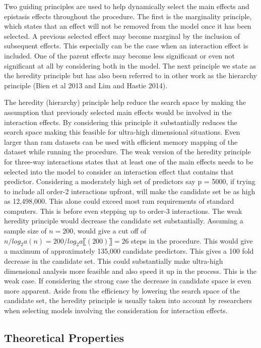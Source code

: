 \documentclass[]{book}
\theoremstyle{definition}
\theoremstyle{definition}
\theoremstyle{remark}
\begin{document}
Two guiding principles are used to help dynamically select the main
effects and epistasis effects throughout the procedure. The first is the
marginality principle, which states that an effect will not be removed
from the model once it has been selected. A previous selected effect may
become marginal by the inclusion of subsequent effects. This especially
can be the case when an interaction effect is included. One of the
parent effects may become less significant or even not significant at
all by considering both in the model. The next principle we state as the
heredity principle but has also been referred to in other work as the
hierarchy principle (Bien et al 2013 and Lim and Hastie 2014).

The heredity (hierarchy) principle help reduce the search space by
making the assumption that previously selected main effects would be
involved in the interaction effects. By considering this principle it
substantially reduces the search space making this feasible for
ultra-high dimensional situations. Even larger than ram datasets can be
used with efficient memory mapping of the dataset while running the
procedure. The weak version of the heredity principle for three-way
interactions states that at least one of the main effects needs to be
selected into the model to consider an interaction effect that contains
that predictor. Considering a moderately high set of predictors say p =
5000, if trying to include all order-2 interactions upfront, will make
the candidate set be as high as 12,498,000. This alone could exceed most
ram requirements of standard computers. This is before even stepping up
to order-3 interactions. The weak heredity principle would decrease the
candidate set substantially. Assuming a sample size of \(n = 200\),
would give a cut off of \(n/ lo g_2a(n) =200/lo g_2a〖(200)〗 =26\)
steps in the procedure. This would give a maximum of approximately
135,000 candidate predictors. This gives a 100 fold decrease in the
candidate set. This could substantially make ultra-high dimensional
analysis more feasible and also speed it up in the process. This is the
weak case. If considering the strong case the decrease in candidate
space is even more apparent. Aside from the efficiency by lowering the
search space of the candidate set, the heredity principle is usually
taken into account by researchers when selecting models involving the
consideration for interaction effects.

\subsection{Theoretical Properties}\label{theoretical-properties}
\end{document}
